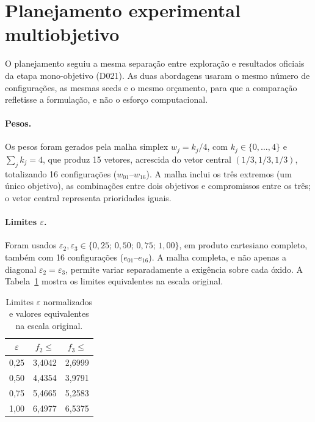 \documentclass[10pt,twocolumn,a4paper]{article}
\begin{document}
\section{Planejamento experimental multiobjetivo}
\label{sec:planejamento_multi}

O planejamento seguiu a mesma separação entre exploração e resultados oficiais da etapa mono-objetivo (D021). As duas abordagens usaram o mesmo número de configurações, as mesmas seeds e o mesmo orçamento, para que a comparação refletisse a formulação, e não o esforço computacional.

\paragraph{Pesos.} Os pesos foram gerados pela malha simplex $w_j = k_j/4$, com $k_j \in \{0, \dots, 4\}$ e $\sum_j k_j = 4$, que produz 15 vetores, acrescida do vetor central $(1/3, 1/3, 1/3)$, totalizando 16 configurações ($w_{01}$--$w_{16}$). A malha inclui os três extremos (um único objetivo), as combinações entre dois objetivos e compromissos entre os três; o vetor central representa prioridades iguais.

\paragraph{Limites $\varepsilon$.} Foram usados $\varepsilon_2, \varepsilon_3 \in \{0{,}25;\, 0{,}50;\, 0{,}75;\, 1{,}00\}$, em produto cartesiano completo, também com 16 configurações ($e_{01}$--$e_{16}$). A malha completa, e não apenas a diagonal $\varepsilon_2 = \varepsilon_3$, permite variar separadamente a exigência sobre cada óxido. A Tabela~\ref{tab:eps_original} mostra os limites equivalentes na escala original.

\begin{table}[H]
\centering
\caption{Limites $\varepsilon$ normalizados e valores equivalentes na escala original.}
\label{tab:eps_original}
\begin{tabular}{ccc}
\toprule
$\varepsilon$ & $f_2 \le$ & $f_3 \le$ \\
\midrule
0,25 & 3,4042 & 2,6999 \\
0,50 & 4,4354 & 3,9791 \\
0,75 & 5,4665 & 5,2583 \\
1,00 & 6,4977 & 6,5375 \\
\bottomrule
\end{tabular}
\end{table}
\end{document}
